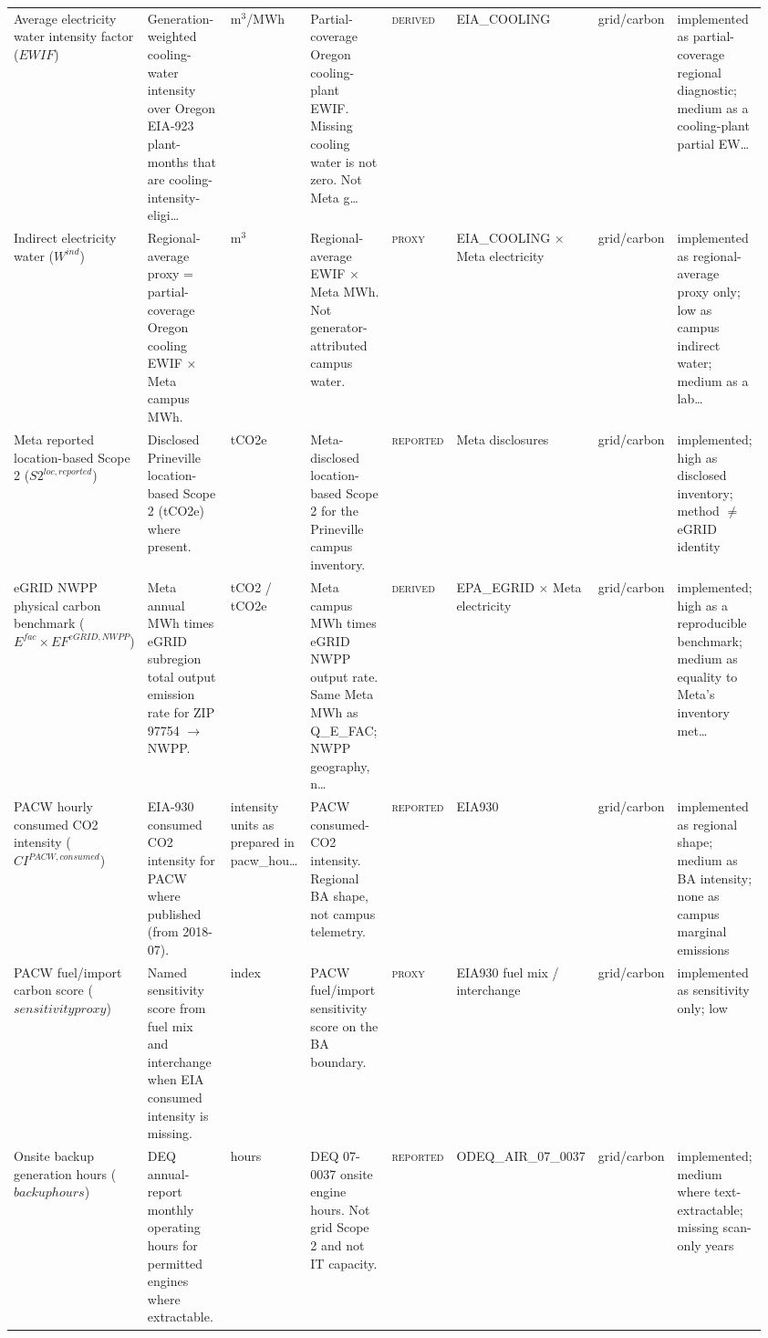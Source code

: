 \documentclass[11pt]{article}
\newcommand{\Reported}{\textsc{reported}}
\newcommand{\Derived}{\textsc{derived}}
\newcommand{\Proxy}{\textsc{proxy}}
\begin{document}
\begin{longtable}{@{}p{0.14\linewidth}p{0.16\linewidth}p{0.08\linewidth}p{0.13\linewidth}p{0.08\linewidth}p{0.14\linewidth}p{0.09\linewidth}p{0.14\linewidth}@{}}
Average electricity water intensity factor ($EWIF$) & Generation-weighted cooling-water intensity over Oregon EIA-923 plant-months that are cooling-intensity-eligi\ldots & m$^{3}$/MWh & Partial-coverage Oregon cooling-plant EWIF. Missing cooling water is not zero. Not Meta g\ldots & \Derived{} & EIA\_COOLING & grid/carbon & implemented as partial-coverage regional diagnostic; medium as a cooling-plant partial EW\ldots\\
Indirect electricity water ($W^{ind}$) & Regional-average proxy = partial-coverage Oregon cooling EWIF $\times$ Meta campus MWh. & m$^{3}$ & Regional-average EWIF $\times$ Meta MWh. Not generator-attributed campus water. & \Proxy{} & EIA\_COOLING $\times$ Meta electricity & grid/carbon & implemented as regional-average proxy only; low as campus indirect water; medium as a lab\ldots\\
Meta reported location-based Scope 2 ($S2^{loc,reported}$) & Disclosed Prineville location-based Scope 2 (tCO2e) where present. & tCO2e & Meta-disclosed location-based Scope 2 for the Prineville campus inventory. & \Reported{} & Meta disclosures & grid/carbon & implemented; high as disclosed inventory; method $\neq$ eGRID identity\\
eGRID NWPP physical carbon benchmark ($E^{fac} \times EF^{eGRID,NWPP}$) & Meta annual MWh times eGRID subregion total output emission rate for ZIP 97754 $\to$ NWPP. & tCO2 / tCO2e & Meta campus MWh times eGRID NWPP output rate. Same Meta MWh as Q\_E\_FAC; NWPP geography, n\ldots & \Derived{} & EPA\_EGRID $\times$ Meta electricity & grid/carbon & implemented; high as a reproducible benchmark; medium as equality to Meta's inventory met\ldots\\
PACW hourly consumed CO2 intensity ($CI^{PACW,consumed}$) & EIA-930 consumed CO2 intensity for PACW where published (from 2018-07). & intensity units as prepared in pacw\_hou\ldots & PACW consumed-CO2 intensity. Regional BA shape, not campus telemetry. & \Reported{} & EIA930 & grid/carbon & implemented as regional shape; medium as BA intensity; none as campus marginal emissions\\
PACW fuel/import carbon score ($sensitivity proxy$) & Named sensitivity score from fuel mix and interchange when EIA consumed intensity is missing. & index & PACW fuel/import sensitivity score on the BA boundary. & \Proxy{} & EIA930 fuel mix / interchange & grid/carbon & implemented as sensitivity only; low\\
Onsite backup generation hours ($backup hours$) & DEQ annual-report monthly operating hours for permitted engines where extractable. & hours & DEQ 07-0037 onsite engine hours. Not grid Scope 2 and not IT capacity. & \Reported{} & ODEQ\_AIR\_07\_0037 & grid/carbon & implemented; medium where text-extractable; missing scan-only years\\

\end{longtable}
\end{document}
